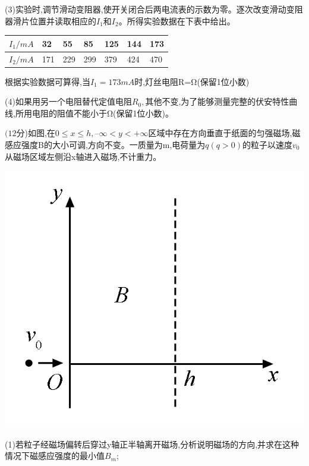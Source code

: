 (3)实验时,调节滑动变阻器,使开关闭合后两电流表的示数为零。逐次改变滑动变阻器滑片位置并读取相应的$I_1$和$I_2$。所得实验数据在下表中给出。
\begin{table}[h]
    \begin{center}
        \begin{tabular}{|l|l|l|l|l|l|l|}
        \hline
        $I_1/mA$ & 32  & 55  & 85  & 125 & 144 & 173 \\ \hline
        $I_2/mA$ & 171 & 229 & 299 & 379 & 424 & 470 \\ \hline
        \end{tabular}
    \end{center}
\end{table}


根据实验数据可算得,当$I_1=173mA$时,灯丝电阻R=Ω(保留1位小数)

(4)如果用另一个电阻替代定值电阻$R_0,$其他不变,为了能够测量完整的伏安特性曲线,所用电阻的阻值不能小于Ω(保留1位小数)。


\question[6] $(12$分)如图,在$0≤x≤h,–∞<y<+∞$区域中存在方向垂直于纸面的匀强磁场,磁感应强度B的大小可调,方向不变。一质量为m,电荷量为$q(q>0)$的粒子以速度$v_0$从磁场区域左侧沿x轴进入磁场,不计重力。
\begin{center}
    \includegraphics[]{img/image7.png}
    \end{center}
(1)若粒子经磁场偏转后穿过y轴正半轴离开磁场,分析说明磁场的方向,并求在这种情况下磁感应强度的最小值$B_m;$

